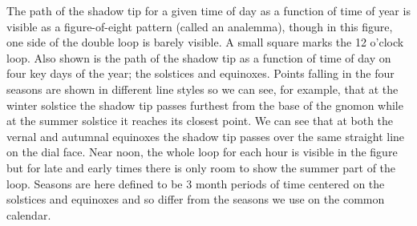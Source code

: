 \documentclass[12pt]{article}
\begin{document}
%
The path of the shadow tip for a given time of day as a function of time of year is visible as a figure-of-eight pattern (called an analemma), though in this figure, one side of the double loop is barely visible. A small square marks the 12 o'clock loop. Also shown is the path of the shadow tip as a function of time of day on four key days of the year; the solstices and equinoxes. Points falling in the four seasons are shown in different line styles so we can see, for example, that at the winter solstice the shadow tip passes furthest from the base of the gnomon while at the summer solstice it reaches its closest point. We can see that at both the vernal and autumnal equinoxes the shadow tip passes over the same straight line on the dial face. Near noon, the whole loop for each hour is visible in the figure but for late and early times there is only room to show the summer part of the loop. Seasons are here defined to be 3 month periods of time centered on the solstices and equinoxes and so differ from the seasons we use on the common calendar.
\end{document}
